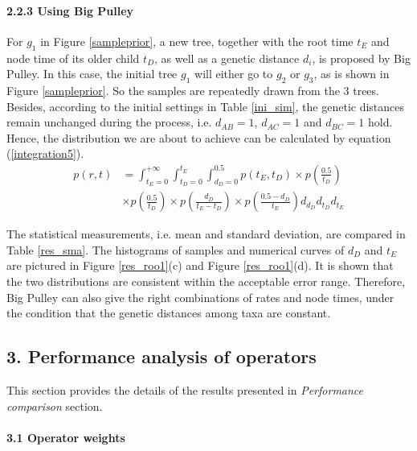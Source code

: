 \documentclass{bmcart}
\begin{document}
\begin{backmatter}
\paragraph*{2.2.3 Using Big Pulley}

For $g_1$ in Figure \ref{sampleprior}, a new tree, together with the root time $t_E$ and node time of its older child $t_D$, as well as a genetic distance $d_i$, is proposed by Big Pulley. In this case, the initial tree $g_1$ will either go to $g_2$ or $g_3$, as is shown in Figure \ref{sampleprior}.  So the samples are repeatedly drawn from the 3 trees. Besides, according to the initial settings in Table \ref{ini_sim}, the genetic distances remain unchanged during the process, i.e. $d_{AB} = 1$, $d_{AC}  = 1$ and $d_{BC} = 1$ hold. Hence, the distribution we are about to achieve can be calculated by equation (\ref{integration5}).
\begin{equation}\label{integration5}
\begin{aligned}
p(r,t) &= \int_{{t_E} = 0}^{ + \infty } {\int_{{t_D} = 0}^{{t_E}} {\int_{{d_D} = 0}^{0.5} {p({t_E},{t_D})} } \times p(\frac{{0.5}}{{{t_D}}})}  \\&\times p(\frac{{0.5}}{{{t_D}}}) \times p(\frac{{{d_D}}}{{{t_E} - {t_D}}}) \times p(\frac{{0.5 - {d_D}}}{{{t_E}}}){d_{d_D}}{d_{t_D}}{d_{t_E}}
\end{aligned}
\end{equation}

The statistical measurements, i.e. mean and standard deviation, are compared in Table \ref{res_sma}. The histograms of samples and numerical curves of ${d_D}$ and ${t_E}$ are pictured in Figure \ref{res_roo1}(c) and Figure \ref{res_roo1}(d). It is shown that the two distributions are consistent within the acceptable error range. Therefore, Big Pulley can also give the right combinations of rates and node times, under the condition that the genetic distances among taxa are constant.

\subsection*{3. Performance analysis of operators}\label{performanceanalysis}
This section provides the details of the results presented in \textit{Performance comparison} section.

\paragraph*{3.1 Operator weights}


\end{backmatter}
\end{document}
